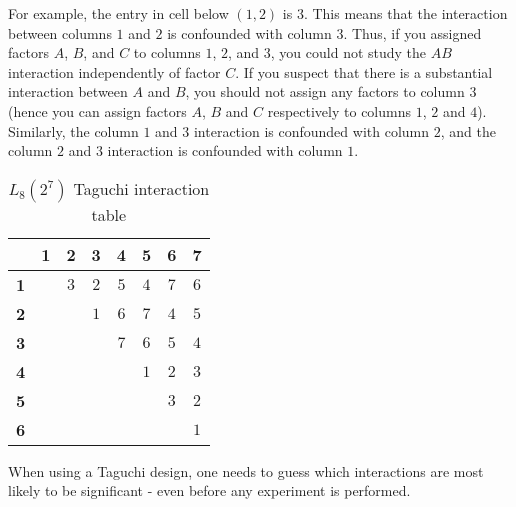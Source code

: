 	For example, the entry in cell below $(1, 2)$ is $3$. This means that the interaction between columns $1$ and $2$ is confounded with column $3$. Thus, if you assigned factors $A$, $B$, and $C$ to columns $1$, $2$, and $3$, you could not study the $AB$ interaction independently of factor $C$. If you suspect that there is a substantial interaction between $A$ and $B$, you should not assign any factors to column $3$ (hence you can assign factors $A$, $B$ and $C$ respectively to columns $1$, $2$ and $4$). Similarly, the column $1$ and $3$ interaction is confounded with column $2$, and the column $2$ and $3$ interaction is confounded with column $1$.
	\begin{table}[H]
		\centering
		\begin{tabular}{|c|c|c|c|c|c|c|c|}
		\hline
		\rowcolor[HTML]{C0C0C0} 
		\textbf{} & \textbf{1} & \textbf{2} & \textbf{3} & \textbf{4} & \textbf{5} & \textbf{6} & \textbf{7} \\ \hline
		\cellcolor[HTML]{C0C0C0}\textbf{1} &  & $3$ & $2$ & $5$ & $4$ & $7$ & $6$ \\ \hline
		\cellcolor[HTML]{C0C0C0}\textbf{2} &  &  & $1$ & $6$ & $7$ & $4$ & $5$ \\ \hline
		\cellcolor[HTML]{C0C0C0}\textbf{3} &  &  &  & $7$ & $6$ & $5$ & $4$ \\ \hline
		\cellcolor[HTML]{C0C0C0}\textbf{4} &  &  &  &  & $1$ & $2$ & $3$ \\ \hline
		\cellcolor[HTML]{C0C0C0}\textbf{5} &  &  &  &  &  & $3$ & $2$ \\ \hline
		\cellcolor[HTML]{C0C0C0}\textbf{6} &  &  &  &  &  &  & $1$ \\ \hline
		\end{tabular}
		\caption{$L_8(2^7)$ Taguchi interaction table}
	\end{table}
	When using a Taguchi design, one needs to guess which interactions are most likely to be significant - even before any experiment is performed.
	
